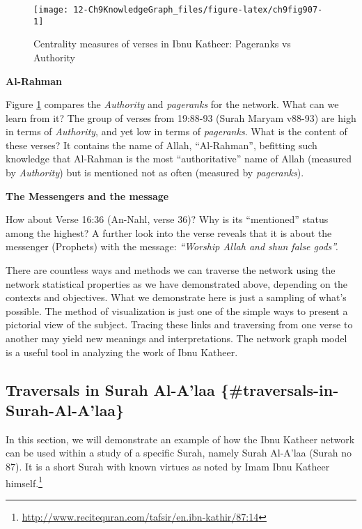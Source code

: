 \documentclass[
]{article}
\begin{document}
\begin{figure}

{\centering \texttt{[image: 12-Ch9KnowledgeGraph\_files/figure-latex/ch9fig907-1]} 

}

\caption{Centrality measures of verses in Ibnu Katheer: Pageranks vs Authority}\label{fig:ch9fig907}
\end{figure}

\textbf{Al-Rahman}

Figure \ref{fig:ch9fig907} compares the \emph{Authority} and \emph{pageranks} for the network. What can we learn from it? The group of verses from 19:88-93 (Surah Maryam v88-93) are high in terms of \emph{Authority}, and yet low in terms of \emph{pageranks}. What is the content of these verses? It contains the name of Allah, ``Al-Rahman'', befitting such knowledge that Al-Rahman is the most ``authoritative'' name of Allah (measured by \emph{Authority}) but is mentioned not as often (measured by \emph{pageranks}).

\textbf{The Messengers and the message}

How about Verse 16:36 (An-Nahl, verse 36)? Why is its ``mentioned'' status among the highest? A further look into the verse reveals that it is about the messenger (Prophets) with the message: \emph{``Worship Allah and shun false gods''.}

There are countless ways and methods we can traverse the network using the network statistical properties as we have demonstrated above, depending on the contexts and objectives. What we demonstrate here is just a sampling of what's possible. The method of visualization is just one of the simple ways to present a pictorial view of the subject. Tracing these links and traversing from one verse to another may yield new meanings and interpretations. The network graph model is a useful tool in analyzing the work of Ibnu Katheer.

\hypertarget{traversals-in-surah-al-alaa-traversals-in-surah-al-alaa}{%
\subsection{Traversals in Surah Al-A'laa \{\#traversals-in-Surah-Al-A'laa\}}\label{traversals-in-surah-al-alaa-traversals-in-surah-al-alaa}}

In this section, we will demonstrate an example of how the Ibnu Katheer network can be used within a study of a specific Surah, namely Surah Al-A'laa (Surah no 87). It is a short Surah with known virtues as noted by Imam Ibnu Katheer himself.\footnote{\url{http://www.recitequran.com/tafsir/en.ibn-kathir/87:14}}
\end{document}
